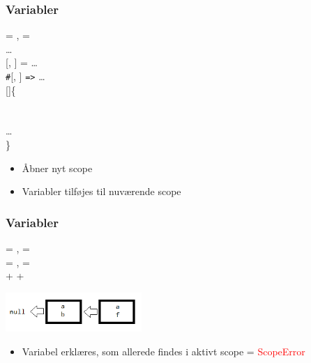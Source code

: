 \begin{frame}[fragile]
\frametitle{Variabler}

  = ,  = \\ 
\quad {} \ldots\\
\vspace{0.25cm}
[, ] = \ldots\\
\vspace{0.25cm}
\texttt{\#}[, ] \texttt{=>} \ldots\\
\vspace{0.25cm}
 []\{\\
\quad {} \\
\quad {} \\
\quad \ldots\\
\}

\begin{itemize}                                  
\item Åbner nyt scope
\item Variabler tilføjes til nuværende scope
\end{itemize}

\end{frame}

\begin{frame}[fragile]
\frametitle{Variabler}
  = ,  = 
 \\
\quad  {}  = ,  = 
\\
\quad \quad {} +  + 

\begin{center}
\includegraphics[height=1.5cm]{../report/pictures/scope2}
\end{center}
\begin{itemize}
  \item Variabel erklæres, som allerede findes i aktivt scope = \textcolor{red}{ScopeError}
\end{itemize}

\end{frame}




